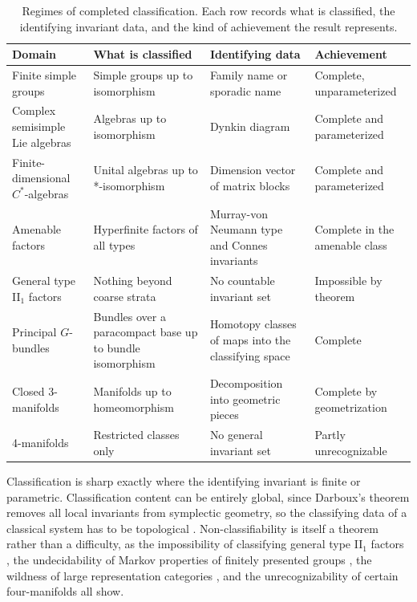 \documentclass[11pt,letterpaper]{article}
\theoremstyle{definition}
\theoremstyle{remark}
\begin{document}
\begin{table}[ht]
\centering
\small
\caption{Regimes of completed classification. Each row records what is classified, the identifying invariant data, and the kind of achievement the result represents.}
\label{tab:regimes}
\begin{tabularx}{\textwidth}{L{0.18\textwidth} X L{0.24\textwidth} L{0.16\textwidth}}
\toprule
Domain & What is classified & Identifying data & Achievement \\
\midrule
Finite simple groups & Simple groups up to isomorphism & Family name or sporadic name & Complete, unparameterized \cite{gorenstein1982,solomon2001} \\
Complex semisimple Lie algebras & Algebras up to isomorphism & Dynkin diagram & Complete and parameterized \cite{humphreys1972} \\
Finite-dimensional $C^*$-algebras & Unital algebras up to *-isomorphism & Dimension vector of matrix blocks \cite{dixmier1977} & Complete and parameterized \\
Amenable factors & Hyperfinite factors of all types & Murray-von Neumann type and Connes invariants \cite{connes1976} & Complete in the amenable class \\
General type II$_1$ factors & Nothing beyond coarse strata & No countable invariant set & Impossible by theorem \cite{mcduff1969} \\
Principal $G$-bundles & Bundles over a paracompact base up to bundle isomorphism & Homotopy classes of maps into the classifying space \cite{milnor1956} & Complete \\
Closed 3-manifolds & Manifolds up to homeomorphism & Decomposition into geometric pieces & Complete by geometrization \cite{scott1983} \\
4-manifolds & Restricted classes only & No general invariant set & Partly unrecognizable \cite{tancer} \\
\bottomrule
\end{tabularx}
\end{table}

Classification is sharp exactly where the identifying invariant is finite or parametric. Classification content can be entirely global, since Darboux's theorem removes all local invariants from symplectic geometry, so the classifying data of a classical system has to be topological \cite{arnold1978}. Non-classifiability is itself a theorem rather than a difficulty, as the impossibility of classifying general type II$_1$ factors \cite{mcduff1969}, the undecidability of Markov properties of finitely presented groups \cite{rabin1958}, the wildness of large representation categories \cite{buchweitz-leuschke}, and the unrecognizability of certain four-manifolds \cite{tancer} all show.
\end{document}
